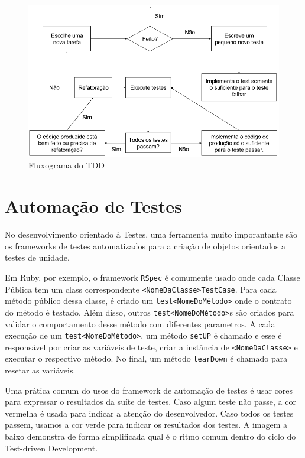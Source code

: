 \documentclass[12pt]{article}
\newcommand{\code}[1]{\texttt{#1}}
\begin{document}
  \begin{figure}[H]
    \centering
    \includegraphics[scale=0.4]{tdd}
    \caption{Fluxograma do TDD}
  \end{figure}

  \section{Automação de Testes}

  No desenvolvimento orientado à Testes, uma ferramenta muito imporantante são
  os frameworks de testes automatizados para a criação de objetos orientados
  a testes de unidade. 

  Em Ruby, por exemplo, o framework \code{RSpec} é comumente usado onde cada Classe 
  Pública tem um class correspondente \code{<NomeDaClasse>TestCase}. Para cada
  método público dessa classe, é criado um \code{test<NomeDoMétodo>} onde o 
  contrato do método é testado. Além disso, outros \code{test<NomeDoMétodo>}s 
  são criados para validar o comportamento desse método com diferentes 
  parametros. A cada execução de um \code{test<NomeDoMétodo>}, um método 
  \code{setUP} é chamado e esse é responsável por criar as variáveis de teste,
  criar a instância de \code{<NomeDaClasse>} e executar o respectivo método.
  No final, um método \code{tearDown} é chamado para resetar as variáveis.

  Uma prática comum do usos do framework de automação de testes é usar cores
  para expressar o resultados da suíte de testes. Caso algum teste não passe,
  a cor vermelha é usada para indicar a atenção do desenvolvedor. Caso todos os
  testes passem, usamos a cor verde para indicar os resultados dos testes. A 
  imagem a baixo demonstra de forma simplificada qual é o ritmo comum dentro do
  ciclo do Test-driven Development.
\end{document}
